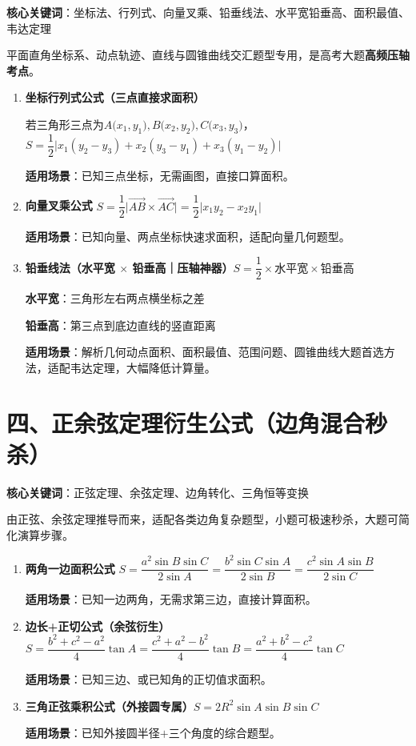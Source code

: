 \documentclass[10pt,CJKmath]{ctexart}
\begin{document}
\textbf{核心关键词}：坐标法、行列式、向量叉乘、铅垂线法、水平宽铅垂高、面积最值、韦达定理

平面直角坐标系、动点轨迹、直线与圆锥曲线交汇题型专用，是高考大题\textbf{高频压轴考点}。
\begin{enumerate}[resume]
	\item\textbf{坐标行列式公式（三点直接求面积）}

若三角形三点为$A\big(x_1,y_1\big),B\big(x_2,y_2\big),C\big(x_3,y_3\big)$，\colorbox{yellow!10}{$S=\dfrac{1}{2}\big|x_1(y_2-y_3)+x_2(y_3-y_1)+x_3(y_1-y_2)\big|$}

\textbf{适用场景}：已知三点坐标，无需画图，直接口算面积。

	\item\textbf{向量叉乘公式} \colorbox{yellow!10}{$S=\dfrac{1}{2}\big|\overrightarrow{AB}\times\overrightarrow{AC}\big|=\dfrac{1}{2}\big|x_1y_2-x_2y_1\big|$}

\textbf{适用场景}：已知向量、两点坐标快速求面积，适配向量几何题型。

	\item\textbf{铅垂线法（水平宽 $\times$ 铅垂高｜压轴神器）}\colorbox{yellow!10}{$S=\dfrac{1}{2}\times 水平宽 \times 铅垂高$}

\textbf{水平宽}：三角形左右两点横坐标之差~

\textbf{铅垂高}：第三点到底边直线的竖直距离~

\textbf{适用场景}：解析几何动点面积、面积最值、范围问题、圆锥曲线大题首选方法，适配韦达定理，大幅降低计算量。

\end{enumerate}

\section*{四、正余弦定理衍生公式（边角混合秒杀）}

\textbf{核心关键词}：正弦定理、余弦定理、边角转化、三角恒等变换

由正弦、余弦定理推导而来，适配各类边角复杂题型，小题可极速秒杀，大题可简化演算步骤。
\begin{enumerate}[resume]
	\item \textbf{ 两角一边面积公式} \colorbox{yellow!10}{$S=\dfrac{a^2\sin B \sin C}{2\sin A}=\dfrac{b^2\sin C \sin A}{2\sin B}=\dfrac{c^2\sin A \sin B}{2\sin C}$}

\textbf{适用场景}：已知一边两角，无需求第三边，直接计算面积。

	\item\textbf{边长+正切公式（余弦衍生）}\colorbox{yellow!10}{$S=\dfrac{b^2+c^2-a^2}{4}\tan A=\dfrac{c^2+a^2-b^2}{4}\tan B=\dfrac{a^2+b^2-c^2}{4}\tan C$}

\textbf{适用场景}：已知三边、或已知角的正切值求面积。

		\item\textbf{三角正弦乘积公式（外接圆专属）}\colorbox{yellow!10}{$S=2R^2\sin A\sin B\sin C$}

\textbf{适用场景}：已知外接圆半径$+$三个角度的综合题型。

\end{enumerate}
\end{document}
